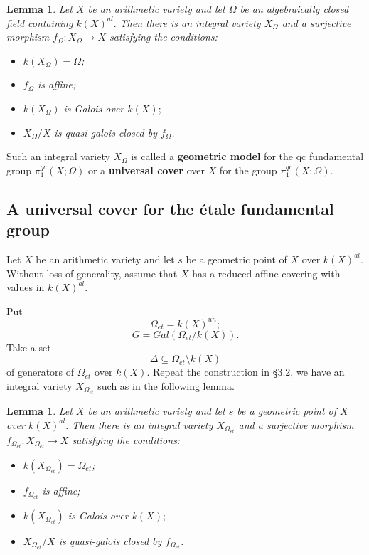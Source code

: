 \documentclass[12pt,twoside,reqno]{amsart}
\newtheorem{lemma}[theorem]{Lemma}
\theoremstyle{definition}
\numberwithin{equation}{section}
\begin{document}
\begin{lemma}
Let $X$ be an arithmetic variety and let $\Omega $ be an algebraically
closed field containing $k\left( X\right) ^{al}.$ Then there is an integral
variety $X_{\Omega }$ and a surjective morphism $f_{\Omega }:X_{\Omega
}\rightarrow X$ satisfying the conditions:

\begin{itemize}
\item $k\left( X_{\Omega }\right) =\Omega $;

\item $f_{\Omega }$ is affine;

\item $k\left( X_{\Omega }\right) $ is Galois over $k\left( X\right) ;$

\item $X_{\Omega }/X$ is quasi-galois closed by $f_{\Omega }$.
\end{itemize}
\end{lemma}

Such an integral variety $X_{\Omega }$ is called a \textbf{geometric model}
for the qc fundamental group $\pi _{1}^{qc}\left( X;\Omega \right)$ or a
\textbf{universal cover} over $X$ for the group $\pi _{1}^{qc}\left(
X;\Omega \right)$.

\subsection{A universal cover for the \'{e}tale fundamental group}

Let $X$ be an arithmetic variety and let $s$ be a geometric point of $X$
over $k\left( X\right) ^{al}.$ Without loss of generality, assume that $X$
has a reduced affine covering with values in $k\left( X\right) ^{al}.$

Put $$
\Omega _{et}=k\left( X\right) ^{un};$$
$$G=Gal\left( \Omega _{et}/k\left( X\right) \right) .$$ Take a set $$\Delta
\subseteq \Omega _{et}\setminus k\left( X\right)$$ of generators
of $\Omega _{et}$ over $k\left( X\right) .$ Repeat the construction in \S 3.2, we have an integral variety $X_{\Omega _{et}}$ such as in the following
lemma.

\begin{lemma}
Let $X$ be an arithmetic variety and let $s$ be a geometric point of $X$
over $k\left( X\right) ^{al}.$ Then there is an integral variety $X_{\Omega
_{et}}$ and a surjective morphism $f_{\Omega _{et}}:X_{\Omega
_{et}}\rightarrow X$ satisfying the conditions:

\begin{itemize}
\item $k\left( X_{\Omega _{et}}\right) =\Omega _{et}$;

\item $f_{\Omega _{et}}$ is affine;

\item $k\left( X_{\Omega _{et}}\right) $ is Galois over $k\left( X\right) ;$

\item $X_{\Omega _{et}}/X$ is quasi-galois closed by $f_{\Omega _{et}}$.
\end{itemize}
\end{lemma}
\end{document}
